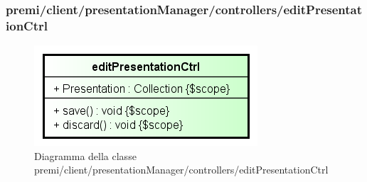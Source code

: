 \subsubsection{premi/client/presentationManager/controllers/editPresentationCtrl}
\begin{figure}[H]
\begin{center}
\includegraphics[scale=0.90]{img/diacla/editPresentationCtrl.png}
\caption{Diagramma della classe premi/client/presentationManager/controllers/editPresentationCtrl}
\end{center}
\end{figure}

